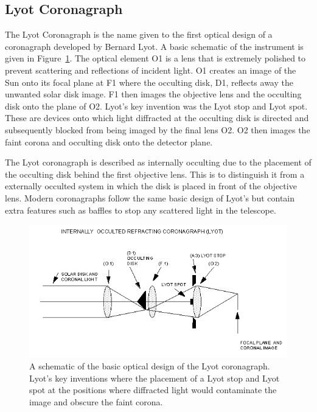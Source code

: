 \subsection{Lyot Coronagraph}\label{sec:22}
The Lyot Coronagraph is the name given to the first optical design of a coronagraph developed by Bernard Lyot. A basic schematic of the instrument is given in Figure~\ref{fig:lyot}. The optical element O1 is a lens that is extremely polished to prevent scattering and reflections of incident light. O1 creates an image of the Sun onto its focal plane at F1 where the occulting disk, D1, reflects away the unwanted solar disk image. F1 then images the objective lens and the occulting disk onto the plane of O2. Lyot's key invention was the Lyot stop and Lyot spot. These are devices onto which light diffracted at the occulting disk is directed and subsequently blocked from being imaged by the final lens O2. O2 then images the faint corona and occulting disk onto the detector plane. 

The Lyot coronagraph is described as internally occulting due to the placement of the occulting disk behind the first objective lens. This is to distinguish it from a externally occulted system in which the disk is placed in front of the objective lens. Modern coronagraphs follow the same basic design of Lyot's but contain extra features such as baffles to stop any scattered light in the telescope. 

\begin{figure}[!h]
\begin{center}
\includegraphics[trim=0cm 1.0cm 0cm 0cm, scale=0.8]{images/Lyot_coronagraph}
\caption[The Lyot coronagraph]{A schematic of the basic optical design of the Lyot coronagraph. Lyot's key inventions where the placement of a Lyot stop and Lyot spot at the positions where diffracted light would contaminate the image and obscure the faint corona.}
\label{fig:lyot}
\end{center}
\end{figure}

